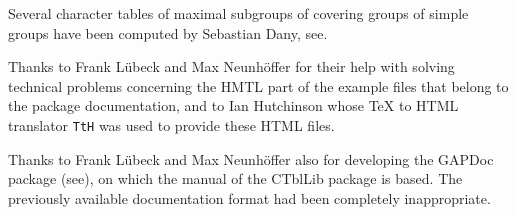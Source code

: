 \documentclass[a4paper,11pt]{report}
\begin{document}
{{ Several character tables of maximal subgroups of covering groups of simple
groups have been computed by Sebastian Dany, see{\nobreakspace}\cite{Dan06}.  

 Thanks to Frank L{\"u}beck and Max Neunh{\"o}ffer for their help with solving
technical problems concerning the HMTL part of the example files that belong
to the package documentation, and to Ian Hutchinson whose {\TeX} to HTML translator \texttt{TtH} was used to provide these HTML files. 

 Thanks to Frank L{\"u}beck and Max Neunh{\"o}ffer also for developing the \textsf{GAPDoc} package (see{\nobreakspace}\cite{GAPDoc}), on which the manual of the \textsf{CTblLib} package is based. The previously available documentation format had been
completely inappropriate. }

 }

     
\end{document}
